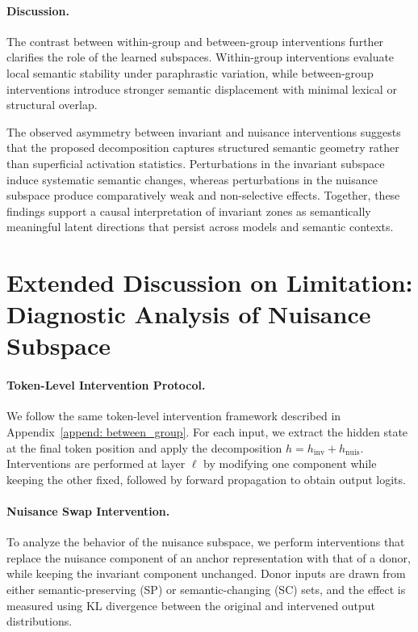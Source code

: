 \paragraph{Discussion.}
The contrast between within-group and between-group interventions further clarifies the role of the learned subspaces. Within-group interventions evaluate local semantic stability under paraphrastic variation, while between-group interventions introduce stronger semantic displacement with minimal lexical or structural overlap.

The observed asymmetry between invariant and nuisance interventions suggests that the proposed decomposition captures structured semantic geometry rather than superficial activation statistics. Perturbations in the invariant subspace induce systematic semantic changes, whereas perturbations in the nuisance subspace produce comparatively weak and non-selective effects. Together, these findings support a causal interpretation of invariant zones as semantically meaningful latent directions that persist across models and semantic contexts.



\section{Extended Discussion on Limitation: Diagnostic Analysis of Nuisance Subspace}
\label{app:nuisance_swap}

\paragraph{Token-Level Intervention Protocol.}
We follow the same token-level intervention framework described in Appendix~\ref{append: between_group}. For each input, we extract the hidden state at the final token position and apply the decomposition $h = h_{\mathrm{inv}} + h_{\mathrm{nuis}}$. Interventions are performed at layer $\ell$ by modifying one component while keeping the other fixed, followed by forward propagation to obtain output logits.

\paragraph{Nuisance Swap Intervention.}
To analyze the behavior of the nuisance subspace, we perform interventions that replace the nuisance component of an anchor representation with that of a donor, while keeping the invariant component unchanged. Donor inputs are drawn from either semantic-preserving (SP) or semantic-changing (SC) sets, and the effect is measured using KL divergence between the original and intervened output distributions.

